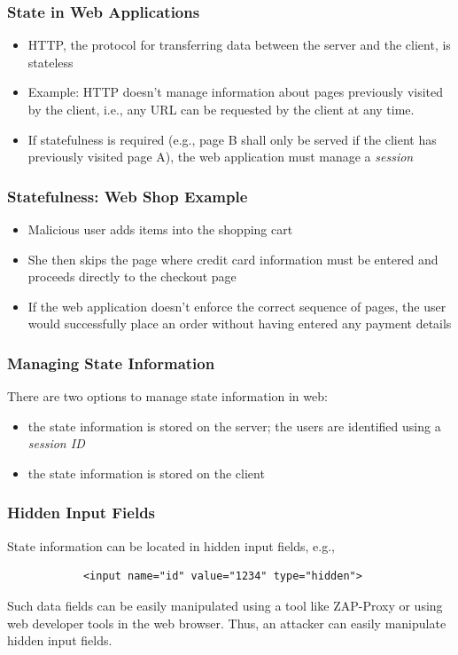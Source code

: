 
\begin{frame}
    \frametitle{State in Web Applications}
        \begin{itemize}
        \item HTTP, the protocol for transferring data between the server and the client, is stateless
        \item Example: HTTP doesn't manage information about pages previously visited by the client, i.e., any URL can be requested by the client at any time. 
        \item If statefulness is required (e.g., page B shall only be served if the client has previously visited page A), the web application must manage a \textit{session}
    \end{itemize}
\end{frame}

\begin{frame}
    \frametitle{Statefulness: Web Shop Example}
    \begin{itemize}
        \item Malicious user adds items into the shopping cart
        \item She then skips the page where credit card information must be entered and proceeds directly to the checkout page
        \item If the web application doesn't enforce the correct sequence of pages, the user would successfully place an order without having entered any payment details 
    \end{itemize}
\end{frame}

\begin{frame}
    \frametitle{Managing State Information}
    There are two options to manage state information in web:
    \begin{itemize}
        \item the state information is stored on the server; the users are identified using a \textit{session ID}
        \item the state information is stored on the client
    \end{itemize}
\end{frame}

\begin{frame}[fragile]
    \frametitle{Hidden Input Fields}
    State information can be located in hidden input fields, e.g., 
    \begin{center}
        \begin{verbatim}
            <input name="id" value="1234" type="hidden">        
        \end{verbatim}
    \end{center}

    Such data fields can be easily manipulated using a tool like ZAP-Proxy or using web developer tools in the web browser. Thus, an attacker can easily manipulate hidden input fields. 
\end{frame}

